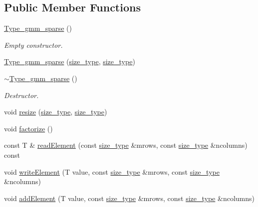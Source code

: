 \subsection*{Public Member Functions}
\begin{DoxyCompactItemize}
\item 
\hyperlink{classlmx_1_1Type__gmm__sparse_a4a6f90a7a891cf649fa3d9106ad815fc}{Type\-\_\-gmm\-\_\-sparse} ()
\begin{DoxyCompactList}\small\item\em Empty constructor. \end{DoxyCompactList}\item 
\hyperlink{classlmx_1_1Type__gmm__sparse_a84872d9c6e23370470b66f7d07bbcddc}{Type\-\_\-gmm\-\_\-sparse} (\hyperlink{lmx__mat__data_8h_a49b489a408a211a90e766329c0732d7b}{size\-\_\-type}, \hyperlink{lmx__mat__data_8h_a49b489a408a211a90e766329c0732d7b}{size\-\_\-type})
\item 
\hyperlink{classlmx_1_1Type__gmm__sparse_aa56f5dfd75de4116813d36829bf9f893}{$\sim$\-Type\-\_\-gmm\-\_\-sparse} ()
\begin{DoxyCompactList}\small\item\em Destructor. \end{DoxyCompactList}\item 
void \hyperlink{classlmx_1_1Type__gmm__sparse_ad2f7d101bef00f3bb214cdff5ff900ba}{resize} (\hyperlink{lmx__mat__data_8h_a49b489a408a211a90e766329c0732d7b}{size\-\_\-type}, \hyperlink{lmx__mat__data_8h_a49b489a408a211a90e766329c0732d7b}{size\-\_\-type})
\item 
void \hyperlink{classlmx_1_1Type__gmm__sparse_a63603bd4b908d19c75e289f709d4a575}{factorize} ()
\item 
const T \& \hyperlink{classlmx_1_1Type__gmm__sparse_afcb853a70a72344f5708f704e052e383}{read\-Element} (const \hyperlink{lmx__mat__data_8h_a49b489a408a211a90e766329c0732d7b}{size\-\_\-type} \&mrows, const \hyperlink{lmx__mat__data_8h_a49b489a408a211a90e766329c0732d7b}{size\-\_\-type} \&ncolumns) const 
\item 
void \hyperlink{classlmx_1_1Type__gmm__sparse_a41dfa3ea72a1af176d48654d7a9a537d}{write\-Element} (T value, const \hyperlink{lmx__mat__data_8h_a49b489a408a211a90e766329c0732d7b}{size\-\_\-type} \&mrows, const \hyperlink{lmx__mat__data_8h_a49b489a408a211a90e766329c0732d7b}{size\-\_\-type} \&ncolumns)
\item 
void \hyperlink{classlmx_1_1Type__gmm__sparse_a5b62f0ed02f6235983276d9a3aeedda9}{add\-Element} (T value, const \hyperlink{lmx__mat__data_8h_a49b489a408a211a90e766329c0732d7b}{size\-\_\-type} \&mrows, const \hyperlink{lmx__mat__data_8h_a49b489a408a211a90e766329c0732d7b}{size\-\_\-type} \&ncolumns)

\end{DoxyCompactItemize}
